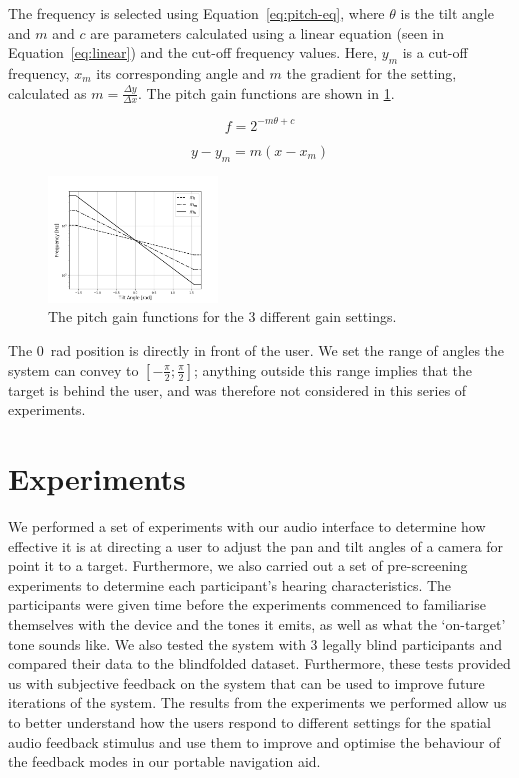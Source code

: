 \documentclass[sigconf, review=true, screen=true, anonymous=true]{acmart}
\begin{document}
The frequency is selected using Equation~\ref{eq:pitch-eq}, where $\theta$ is the tilt angle and $m$ and $c$ are parameters calculated using a linear equation (seen in Equation~\ref{eq:linear}) and the cut-off frequency values.
Here, $y_m$ is a cut-off frequency, $x_m$ its corresponding angle and $m$ the gradient for the setting, calculated as $m = \frac{\Delta y}{\Delta x}$.
The pitch gain functions are shown in \cref{fig:pitch-gain}. 

\begin{equation}
  \label{eq:pitch-eq}
  f = 2^{-m \theta + c}
\end{equation}

\begin{equation}
  \label{eq:linear}
  y - y_m = m(x - x_m)
\end{equation}

\begin{figure}
  \centering
  \includegraphics[width=0.4\textwidth]{figures/pitch_gain_functions.png}
  \caption{The pitch gain functions for the 3 different gain settings. }
  \label{fig:pitch-gain}
\end{figure}

The \SI{0}{\radian} position is directly in front of the user.
We set the range of angles the system can convey to $[-\frac{\pi}{2}; \frac{\pi}{2}]$; anything outside this range implies that the target is behind the user, and was therefore not considered in this series of experiments. 

\section{Experiments}
\label{sec:experiments}

We performed a set of experiments with our audio interface to determine how effective it is at directing a user to adjust the pan and tilt angles of a camera for point it to a target.
Furthermore, we also carried out a set of pre-screening experiments to determine each participant's hearing characteristics.
The participants were given time before the experiments commenced to familiarise themselves with the device and the tones it emits, as well as what the `on-target' tone sounds like.
We also tested the system with 3 legally blind participants and compared their data to the blindfolded dataset.
Furthermore, these tests provided us with subjective feedback on the system that can be used to improve future iterations of the system.
The results from the experiments we performed allow us to better understand how the users respond to different settings for the spatial audio feedback stimulus and use them to improve and optimise the behaviour of the feedback modes in our portable navigation aid.
\end{document}
